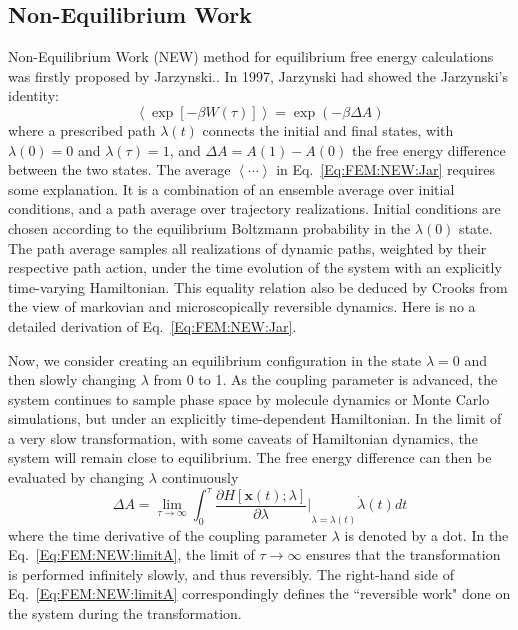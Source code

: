 \subsection{Non-Equilibrium Work\label{Sec:FEM:NEW}}
Non-Equilibrium Work (NEW) method for equilibrium free energy calculations was firstly proposed by Jarzynski.\cite{JarzynskiPRL1997}. 
In 1997, Jarzynski had showed the Jarzynski's identity:
\begin{equation}
\left< \exp\left[-\beta W(\tau)\right] \right> = \exp{(-\beta \Delta A)}
\label{Eq:FEM:NEW:Jar}
\end{equation} 
where a prescribed path $\lambda(t)$ connects the initial and final states, with $\lambda(0)=0$ and $\lambda(\tau)=1$, and $\Delta A = A(1) - A(0)$ the free energy difference between the two states. The average $\left \langle \cdots \right \rangle$ in Eq.~\ref{Eq:FEM:NEW:Jar} requires some explanation. It is a combination of an ensemble average over initial conditions, and a path average over trajectory realizations. Initial conditions are chosen according to the equilibrium Boltzmann probability in the $\lambda(0)$ state. The path average samples all realizations of dynamic paths, weighted by their respective path action, under the time evolution of the system with an explicitly time-varying Hamiltonian. This equality relation also be deduced by Crooks from the view of markovian and microscopically reversible dynamics.\cite{CrooksJSP1998} Here is no a detailed derivation of Eq.~\ref{Eq:FEM:NEW:Jar}.

Now, we consider creating an equilibrium configuration in the state $\lambda=0$ and then slowly changing $\lambda$ from 0 to 1. As the coupling parameter is advanced, the system continues to sample phase space by molecule dynamics or Monte Carlo simulations, but under an explicitly time-dependent Hamiltonian. In the limit of a very slow transformation, with some caveats of Hamiltonian dynamics, the system will remain close to equilibrium. The free energy difference can then be evaluated by changing $\lambda$ continuously
\begin{equation}
\Delta A =\lim_{\tau\to\infty} \int_{0}^{\tau} {\frac{\partial{H\left[\textbf{x}(t);\lambda\right]}}{\partial{\lambda}}\bigg\rvert}_{\lambda=\lambda(t)} \dot{\lambda}(t) dt
\label{Eq:FEM:NEW:limitA}
\end{equation}  
where the time derivative of the coupling parameter $\lambda$ is denoted by a dot. In the Eq.~\ref{Eq:FEM:NEW:limitA}, the limit of $\tau\to\infty$ ensures that the transformation is performed infinitely slowly, and thus reversibly. The right-hand side of Eq.~\ref{Eq:FEM:NEW:limitA} correspondingly defines the ``reversible work" done on the system during the transformation.

